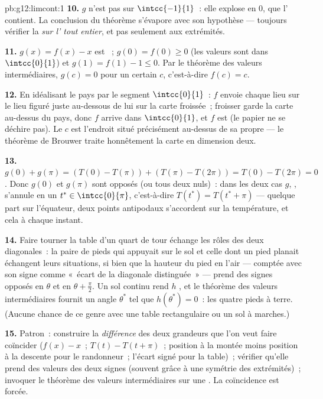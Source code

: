 \begin{solution}{pb:g12:limcont:1}
\textbf{10.} $g$ n'est pas  sur $\intcc{-1}{1}$~: elle
explose en $0$, que l' contient. La conclusion du théorème
s'évapore avec son hypothèse --- toujours vérifier la 
\emph{sur l' tout entier}, et pas seulement aux
extrémités.

\textbf{11.} $g(x) = f(x) - x$ est ~;
$g(0) = f(0) \geq 0$ (les valeurs sont dans $\intcc{0}{1}$) et
$g(1) = f(1) - 1 \leq 0$. Par le théorème des valeurs
intermédiaires, $g(c) = 0$ pour un certain $c$, c'est-à-dire
$f(c) = c$.

\textbf{12.} En idéalisant le pays par le segment $\intcc{0}{1}$~:
$f$ envoie chaque lieu sur le lieu figuré juste au-dessous de lui
sur la carte froissée~; froisser garde la carte au-dessus du pays,
donc $f$ arrive dans $\intcc{0}{1}$, et $f$ est  (le papier
ne se déchire pas). Le  $c$ est l'endroit situé
précisément au-dessus de sa propre  --- le théorème de Brouwer
traite honnêtement la carte en dimension deux.

\textbf{13.} $g(0) + g(\pi) = \left(T(0) - T(\pi)\right) +
\left(T(\pi) - T(2\pi)\right) = T(0) - T(2\pi) = 0$. Donc $g(0)$ et
$g(\pi)$ sont opposés (ou tous deux nuls)~: dans les deux cas $g$,
, s'annule en un $t^* \in \intcc{0}{\pi}$, c'est-à-dire
$T(t^*) = T(t^* + \pi)$ --- quelque part sur l'équateur, deux points
antipodaux s'accordent sur la température, et cela à chaque
instant.

\textbf{14.} Faire tourner la table d'un quart de tour échange les
rôles des deux diagonales~: la paire de pieds qui appuyait sur le
sol et celle dont un pied planait échangent leurs situations, si
bien que la hauteur du pied en l'air --- comptée avec son signe
comme «~écart de la diagonale distinguée~» --- prend des signes
opposés en $\theta$ et en $\theta + \frac\pi2$. Un sol continu rend
$h$ , et le théorème des valeurs intermédiaires fournit un
angle $\theta^*$ tel que $h(\theta^*) = 0$~: les quatre pieds à
terre. (Aucune chance de ce genre avec une table rectangulaire ou un
sol à marches.)

\textbf{15.} Patron~: construire la \emph{différence} des deux
grandeurs que l'on veut faire coïncider ($f(x) - x$~;
$T(t) - T(t + \pi)$~; position à la montée moins position à la
descente pour le randonneur~; l'écart signé pour la table)~;
vérifier qu'elle prend des valeurs des deux signes (souvent grâce à
une symétrie des extrémités)~; invoquer le théorème des valeurs
intermédiaires sur une  . La coïncidence est
forcée.


\end{solution}
